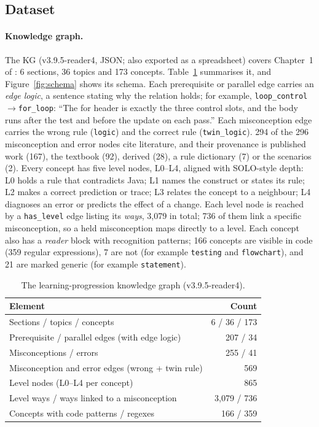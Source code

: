 \documentclass[sigconf,nonacm]{acmart}
\newcommand{\code}[1]{\texttt{#1}}
\begin{document}
\subsection{Dataset}
\label{sec:data}
\paragraph{Knowledge graph.} The KG (v3.9.5-reader4, JSON; also exported as a spreadsheet) covers Chapter~1 of
\cite{sedgewick2017java}: 6 sections, 36 topics and 173 concepts. Table~\ref{tab:kg} summarises it, and
Figure~\ref{fig:schema} shows its schema. Each prerequisite or parallel edge carries an \emph{edge logic}, a sentence
stating why the relation holds; for example, \code{loop\_control}$\to$\code{for\_loop}: ``The for header is exactly the
three control slots, and the body runs after the test and before the update on each pass.'' Each misconception
edge carries the wrong rule (\code{logic}) and the correct rule (\code{twin\_logic}). 294 of the 296 misconception and
error nodes cite literature, and their provenance is published work (167), the textbook (92), derived (28), a rule
dictionary (7) or the scenarios (2). Every concept has five level nodes, L0--L4, aligned with SOLO-style depth: L0 holds
a rule that contradicts Java; L1 names the construct or states its rule; L2 makes a correct prediction or trace;
L3 relates the concept to a neighbour; L4 diagnoses an error or predicts the effect of a change. Each level node is
reached by a \code{has\_level} edge listing its \emph{ways}, 3{,}079 in total; 736 of them link a specific misconception,
so a held misconception maps directly to a level. Each concept also has a \emph{reader} block with recognition
patterns; 166 concepts are visible in code (359 regular expressions), 7 are not (for example \code{testing} and
\code{flowchart}), and 21 are marked generic (for example \code{statement}).

\begin{table}[t]
\caption{The learning-progression knowledge graph (v3.9.5-reader4).}
\label{tab:kg}
\small
\begin{tabular}{@{}p{}r@{}}
\toprule
Element & Count \\
\midrule
Sections / topics / concepts & 6 / 36 / 173 \\
Prerequisite / parallel edges (with edge logic) & 207 / 34 \\
Misconceptions / errors & 255 / 41 \\
Misconception and error edges (wrong + twin rule) & 569 \\
Level nodes (L0--L4 per concept) & 865 \\
Level ways / ways linked to a misconception & 3{,}079 / 736 \\
Concepts with code patterns / regexes & 166 / 359 \\
\bottomrule
\end{tabular}
\end{table}
\end{document}
